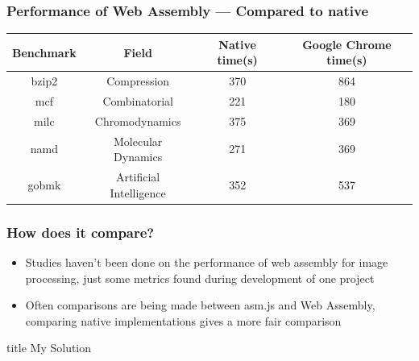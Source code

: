 \documentclass{beamer}
\begin{document}
\begin{frame}
    \frametitle{Performance of Web Assembly — Compared to native \cite{jangda2019not}}

    {\small
        \begin{table}[H]
            \centering
            \vspace*{6pt}
            \label{native}
            \begin{tabular}{cccc}\hline\hline
                Benchmark & Field                   & Native time(s) & Google Chrome time(s) \\ \hline
                bzip2     & Compression             & 370            & 864                   \\
                mcf       & Combinatorial           & 221            & 180                   \\
                milc      & Chromodynamics          & 375            & 369                   \\
                namd      & Molecular Dynamics      & 271            & 369                   \\
                gobmk     & Artificial Intelligence & 352            & 537
            \end{tabular}
        \end{table}
    }
\end{frame}

\begin{frame}
    \frametitle{How does it compare?}
    \begin{itemize}
        \item Studies haven't been done on the performance of web assembly for image processing, just some metrics found during development of one project
        \item Often comparisons are being made between asm.js and Web Assembly, comparing native implementations gives a more fair comparison
    \end{itemize}
\end{frame}

\begin{frame}
    \vfill
    \centering
    \begin{beamercolorbox}[sep=8pt,center,shadow=true,rounded=true]{title}
         My Solution\par%
    \end{beamercolorbox}
    \vfill
\end{frame}
\end{document}
